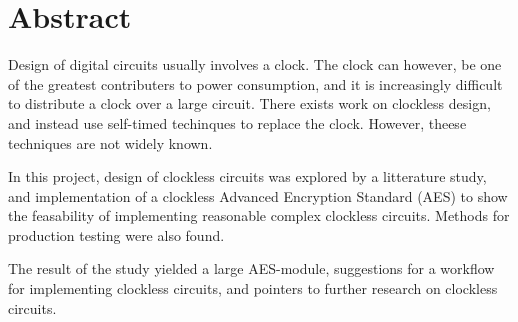\section*{Abstract}

Design of digital circuits usually involves a clock. The clock can
however, be one of the greatest contributers to power consumption, and
it is increasingly difficult to distribute a clock over a large
circuit. There exists work on clockless design, and instead use
self-timed techinques to replace the clock. However, theese techniques
are not widely known.

In this project, design of clockless circuits was explored by a
litterature study, and implementation of a clockless Advanced
Encryption Standard (AES) to show the feasability of implementing
reasonable complex clockless circuits. Methods for production testing
were also found.

The result of the study yielded a large AES-module, suggestions for a
workflow for implementing clockless circuits, and pointers to further
research on clockless circuits.
